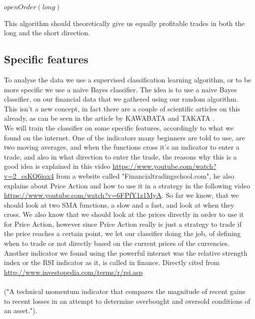 \documentclass[10pt]{IEEEtran}
\begin{document}
\begin{center}
\begin{algorithmic}
    	\State $openOrder(long)$	    
	\EndIf
		\Else
		\EndIf
	\EndFor
\EndWhile
{}
\end{algorithmic}
\end{center}

This algorithm should theoretically give us equally profitable trades in both the long and the short direction.

\subsection{Specific features}
To analyse the data we use a supervised classification learning algorithm, or to be more specific we use a naive Bayes classifier. The idea is to use a naive Bayes classifier, on our financial data that we gathered using our random algorithm. This isn't a new concept, in fact there are a couple of scientific articles on this already, as can be seen in the article by KAWABATA and TAKATA \cite{fxNaiveBayes}.\\ 
We will train the classifier on some specific features, accordingly to what we found on the internet. One of the indicators many beginners are told to use, are two moving averages, and when the functions cross it's an indicator to enter a trade, and also in what direction to enter the trade, the reasons why this is a good idea is explained in this video \url{https://www.youtube.com/watch?v=2_csKQ6iqx4} from a website called "Financialtradingschool.com", he also explains about Price Action and how to use it in a strategy in the following video \url{https://www.youtube.com/watch?v=6FPfY1z1MyA}. So far we know, that we should look at two SMA functions, a slow and a fast, and look at when they cross. We also know that we should look at the prices directly in order to use it for Price Action, however since Price Action really is just a strategy to trade if the price reaches a certain point, we let our classifier doing the job, of defining when to trade or not directly based on the current prices of the currencies. Another indicator we found using the powerful internet was the relative strength index or the RSI indicator as it, is called in finance. Directly cited from \url{http://www.investopedia.com/terms/r/rsi.asp}\\
\\
("A technical momentum indicator that compares the magnitude of recent gains to recent losses in an attempt to determine overbought and oversold conditions of an asset.").\\ \\
\end{document}
